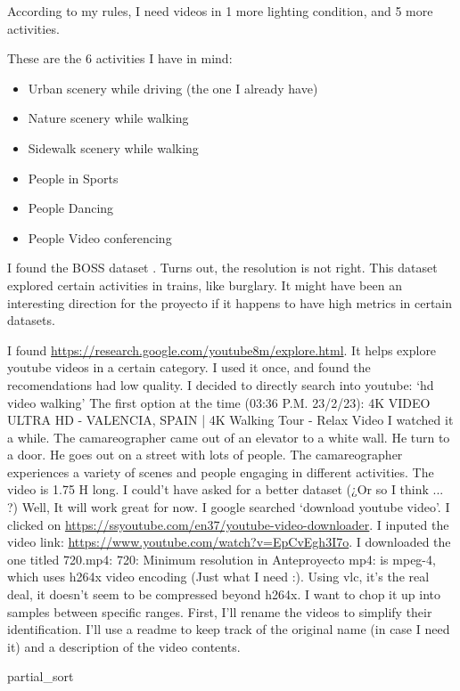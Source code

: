 \documentclass[12pt,oneside]{book}
\begin{document}
  According to my rules, I need videos in 1 more lighting condition, and 5 more activities.

  These are the 6 activities I have in mind:
  \begin{itemize}
    \item Urban scenery while driving (the one I already have)
    \item Nature scenery while walking
    \item Sidewalk scenery while walking
    \item People in Sports
    \item People Dancing
    \item People Video conferencing
  \end{itemize}

  I found the BOSS dataset \cite{Velastin2017}. Turns out, the resolution is not
  right. This dataset explored certain activities in trains, like burglary. It might have been an interesting direction for the proyecto if it happens to have high metrics in certain datasets.

  I found \url{https://research.google.com/youtube8m/explore.html}.
  It helps explore youtube videos in a certain category.
  I used it once, and found the recomendations had low quality.
  I decided to directly search into youtube: `hd video walking'
  The first option at the time (03:36 P.M. 23/2/23): 4K VIDEO ULTRA HD - VALENCIA, SPAIN | 4K Walking Tour - Relax Video
  I watched it a while.
  The camareographer came out of an elevator to a white wall.
  He turn to a door.
  He goes out on a street with lots of people.
  The camareographer experiences a variety of scenes and people engaging in different activities.
  The video is 1.75 H long.
  I could't have asked for a better dataset (¿Or so I think ... ?)
  Well, It will work great for now.
  I google searched `download youtube video'.
  I clicked on \url{https://ssyoutube.com/en37/youtube-video-downloader}.
  I inputed the video link: \url{https://www.youtube.com/watch?v=EpCvEgh3I7o}.
  I downloaded the one titled 720.mp4:
    720: Minimum resolution in Anteproyecto
    mp4: is mpeg-4, which uses h264x video encoding (Just what I need :).
  Using vlc, it's the real deal, it doesn't seem to be compressed beyond h264x.
  I want to chop it up into samples between specific ranges.
  First, I'll rename the videos to simplify their identification.
  I'll use a readme to keep track of the original name (in case I need it) and a
  description of the video contents.

partial\_sort


  \printbibliography[title={Bibliografía},heading=bibintoc]
\end{document}

